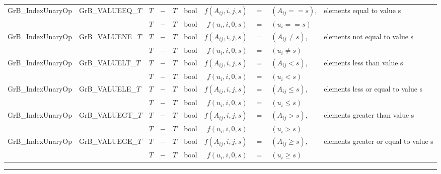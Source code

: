 \begin{landscape}
\begin{table}
\begin{threeparttable}
{\begin{tabular}{l|l|cccc|rcll}
{\sf GrB\_IndexUnaryOp}   & {\sf GrB\_VALUEEQ\_$T$} 		& $T$ 	& $-$ 		& $T$	 	& {\sf bool} 	& $f(A_{ij},i,j,s)$ & $=$ & $(A_{ij} ==   s)$, 	& elements equal to value s \\
                          &                         		& $T$ 	& $-$ 		& $T$ 		& {\sf bool} 	& $f(u_{i}, i,0,s)$ & $=$ & $(u_{i}  ==   s)$ \\
{\sf GrB\_IndexUnaryOp}   & {\sf GrB\_VALUENE\_$T$} 		& $T$ 	& $-$ 		& $T$ 		& {\sf bool} 	& $f(A_{ij},i,j,s)$ & $=$ & $(A_{ij} \neq s)$, 	& elements not equal to value s \\
                          &                         		& $T$ 	& $-$ 		& $T$ 		& {\sf bool} 	& $f(u_{i}, i,0,s)$ & $=$ & $(u_{i}  \neq s)$ \\
{\sf GrB\_IndexUnaryOp}   & {\sf GrB\_VALUELT\_$T$} 		& $T$ 	& $-$ 		& $T$ 		& {\sf bool} 	& $f(A_{ij},i,j,s)$ & $=$ & $(A_{ij} <    s)$, 	& elements less than value s \\
                          &                         		& $T$ 	& $-$ 		& $T$ 		& {\sf bool} 	& $f(u_{i}, i,0,s)$ & $=$ & $(u_{i}  <    s)$ \\
{\sf GrB\_IndexUnaryOp}   & {\sf GrB\_VALUELE\_$T$} 		& $T$ 	& $-$ 		& $T$ 		& {\sf bool} 	& $f(A_{ij},i,j,s)$ & $=$ & $(A_{ij} \leq s)$, 	& elements less or equal to value s \\
                          &                         		& $T$ 	& $-$ 		& $T$ 		& {\sf bool} 	& $f(u_{i}, i,0,s)$ & $=$ & $(u_{i}  \leq s)$ \\
{\sf GrB\_IndexUnaryOp}   & {\sf GrB\_VALUEGT\_$T$} 		& $T$ 	& $-$ 		& $T$ 		& {\sf bool}	& $f(A_{ij},i,j,s)$ & $=$ & $(A_{ij} >    s)$,	& elements greater than value s \\
                          &                         		& $T$ 	& $-$	 	& $T$ 		& {\sf bool} 	& $f(u_{i}, i,0,s)$ & $=$ & $(u_{i}  >    s)$ \\
{\sf GrB\_IndexUnaryOp}   & {\sf GrB\_VALUEGE\_$T$} 		& $T$ 	& $-$ 		& $T$ 		& {\sf bool} 	& $f(A_{ij},i,j,s)$ & $=$ & $(A_{ij} \geq s)$, 	& elements greater or equal to value s \\
                          &                         		& $T$ 	& $-$ 		& $T$ 		& {\sf bool} 	& $f(u_{i}, i,0,s)$ & $=$ & $(u_{i}  \geq s)$ \\
\end{tabular}
    }
\hrule
\end{threeparttable}
\end{table}


\end{landscape}


